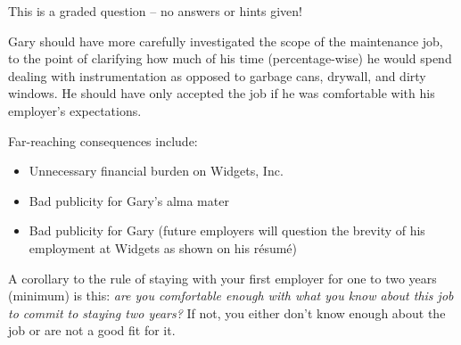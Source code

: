 
This is a graded question -- no answers or hints given!







Gary should have more carefully investigated the scope of the maintenance job, to the point of clarifying how much of his time (percentage-wise) he would spend dealing with instrumentation as opposed to garbage cans, drywall, and dirty windows.  He should have only accepted the job if he was comfortable with his employer's expectations.

\vskip 10pt

Far-reaching consequences include:

\begin{itemize}
\item{} Unnecessary financial burden on Widgets, Inc.
\item{} Bad publicity for Gary's alma mater
\item{} Bad publicity for Gary (future employers will question the brevity of his employment at Widgets as shown on his r\'esum\'e)
\end{itemize}

\vskip 10pt

A corollary to the rule of staying with your first employer for one to two years (minimum) is this: {\it are you comfortable enough with what you know about this job to commit to staying two years?}  If not, you either don't know enough about the job or are not a good fit for it.




